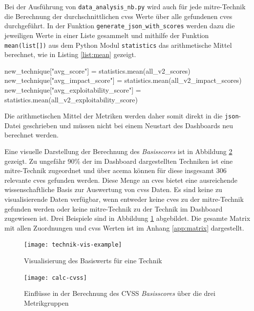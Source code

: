 Bei der Ausführung von \verb|data_analysis_nb.py| wird auch für jede \gls{mitre}-Technik die Berechnung der durchschnittlichen \gls{cvss} Werte über alle gefundenen \glspl{cve} durchgeführt. In der Funktion \verb|generate_json_with_scores| werden dazu die jeweiligen Werte in einer Liste gesammelt und mithilfe der Funktion \verb|mean(list[])| aus dem Python Modul \verb|statistics| das arithmetische Mittel berechnet, wie in Listing \ref{list:mean} gezeigt.
\begin{code}[caption=Berechnung des arithmetischen Mittels aus den CVSS Metriken mehrerer CVEs, label={list:mean}]
    new_technique["avg_score"] = statistics.mean(all_v2_scores)
    new_technique["avg_impact_score"] = statistics.mean(all_v2_impact_scores)
    new_technique["avg_exploitability_score"] = statistics.mean(all_v2_exploitability_score)
\end{code}

Die arithmetischen Mittel der Metriken werden daher somit direkt in die \verb|json|-Datei geschrieben und müssen nicht bei einem Neustart des Dashboards neu berechnet werden.

Eine visuelle Darstellung der Berechnung des \textit{Basisscores} ist in Abbildung \ref{fig:calc-cvss} gezeigt. Zu ungefähr 90\% der im Dashboard dargestellten Techniken ist eine \gls{mitre}-Technik zugeordnet und über \gls{acema} können für diese insgesamt 306 relevante \glspl{cve} gefunden werden. Diese Menge an \glspl{cve} bietet eine ausreichende wissenschaftliche Basis zur Auswertung von \gls{cvss} Daten. Es sind keine zu visualisierende Daten verfügbar, wenn entweder keine \glspl{cve} zu der \gls{mitre}-Technik gefunden werden oder keine \gls{mitre}-Technik zu der Technik im Dashboard zugewiesen ist. Drei Beispiele sind in Abbildung \ref{fig:technik-vis-example} abgebildet. Die gesamte Matrix mit allen Zuordnungen und \gls{cvss} Werten ist im Anhang \ref{app:matrix} dargestellt.

\begin{figure}
    \centering
    \texttt{[image: technik-vis-example]}
    \caption{Visualisierung des Basiswerts für eine Technik}
    \label{fig:technik-vis-example}
\end{figure}


\begin{figure}
    \centering
    \texttt{[image: calc-cvss]}
    \caption{Einflüsse in der Berechnung des CVSS \textit{Basisscores} über die drei Metrikgruppen}
    \label{fig:calc-cvss}
\end{figure}

